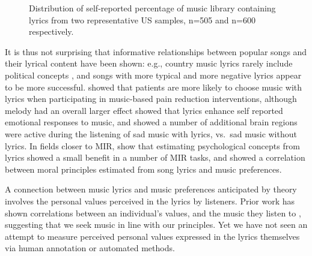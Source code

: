 \documentclass{article}
\begin{document}
\begin{figure}
 \centerline{}
 \caption{Distribution of self-reported percentage of music library containing lyrics from two representative US samples, n=505 and n=600 respectively.}
 \label{fig:lyrics_percentages}
\end{figure}

It is thus not surprising that informative relationships between popular songs and their lyrical content have been shown: e.g., country music lyrics rarely include political concepts \cite{van2005world}, and songs with more typical \cite{north2020relationship} and more negative \cite{brand2019cultural} lyrics appear to be more successful. \cite{howlin2020patients} showed that patients are more likely to choose music with lyrics when participating in music-based pain reduction interventions, although melody had an overall larger effect \cite{ali2006songs} showed that lyrics enhance self reported emotional responses to music, and \cite{brattico2011functional} showed a number of additional brain regions were active during the listening of sad music with lyrics, vs.\ sad music without lyrics. In fields closer to MIR, \cite{kim2020butter} show that estimating psychological concepts from lyrics showed a small benefit in a number of MIR tasks, and \cite{preniqi2022more} showed a correlation between moral principles estimated from song lyrics and music preferences. 

A connection between music lyrics and music preferences anticipated by theory involves the personal values perceived in the lyrics by listeners. Prior work has shown correlations between an individual's values, and the music they listen to \cite{manolios2019influence, gardikiotis2012rock, swami2013metalheads, preniqi2022more}, suggesting that we seek music in line with our principles. Yet we have not seen an attempt to measure perceived personal values expressed in the lyrics themselves via human annotation or automated methods. 
\end{document}
